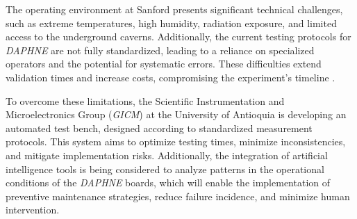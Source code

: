 The operating environment at Sanford presents significant technical challenges, such as extreme temperatures, high humidity, radiation exposure, and limited access to the underground caverns. Additionally, the current testing protocols for \textit{DAPHNE} are not fully standardized, leading to a reliance on specialized operators and the potential for systematic errors. These difficulties extend validation times and increase costs, compromising the experiment's timeline \cite{Esteban_Ferrer}. %




To overcome these limitations, the Scientific Instrumentation and Microelectronics Group (\textit{GICM}) at the University of Antioquia is developing an automated test bench, designed according to standardized measurement protocols. This system aims to optimize testing times, minimize inconsistencies, and mitigate implementation risks. Additionally, the integration of artificial intelligence tools is being considered to analyze patterns in the operational conditions of the \textit{DAPHNE} boards, which will enable the implementation of preventive maintenance strategies, reduce failure incidence, and minimize human intervention. %


